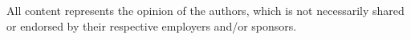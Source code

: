 \documentclass[letterpaper]{article}
\begin{document}
All content represents the opinion of the authors, which is not necessarily shared or endorsed by their respective employers and/or sponsors.

%


\end{document}
